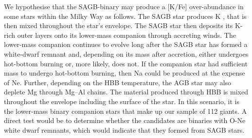 \documentclass[a4paper,fleqn,usenatbib]{mnras}
\begin{document}
We hypothesise that the SAGB-binary may produce a [K/Fe] over-abundance in some stars within the Milky Way as follows. The SAGB star produces K \citep[destroying Na in the process;][]{prantzos2017}, that is then mixed throughout the star's envelope. The SAGB star then deposits its K-rich outer layers onto its lower-mass companion through accreting winds. The lower-mass companion continues to evolve long after the SAGB star has formed a white-dwarf remnant and, depending on its mass after accretion, either undergoes hot-bottom burning or, more likely, does not. If the companion star had sufficient mass to undergo hot-bottom burning, then Na could be produced \citep{prantzos2017} at the expense of Ne. Further, depending on the HBB temperature, the AGB star may also deplete Mg through Mg--Al chains. The material produced through HBB is mixed throughout the envelope including the surface of the star. In this scenario, it is the lower-mass binary companion stars that make up our sample of 112 giants. A direct test would be to determine whether the candidates are binaries with O-Ne white dwarf remnants, which would indicate that they formed from SAGB stars.
\newpage
\end{document}
